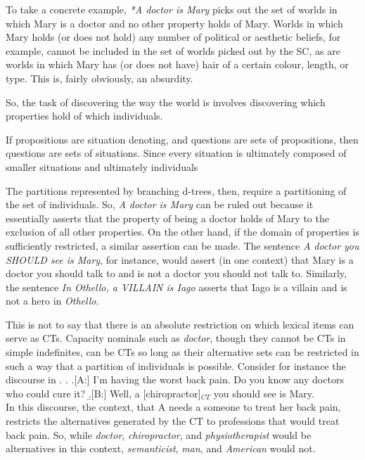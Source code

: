 \documentclass[GPFinal]{subfiles}
\begin{document}
To take a concrete example, \textit{*A doctor is Mary} picks out the set of worlds in which Mary is a doctor and no other property holds of Mary.
Worlds in which Mary holds (or does not hold) any number of political or aesthetic beliefs, for example, cannot be included in the set of worlds picked out by the SC, as are worlds in which Mary has (or does not have) hair of a certain colour, length, or type.
This is, fairly obviously, an absurdity.

So, the task of discovering the way the world is involves discovering which properties hold of which individuals.

If propositions are situation denoting, and questions are sets of propositions, then questions are sets of situations.
Since every situation is ultimately composed of smaller situations and ultimately individuals

The partitions represented by branching d-trees, then, require a partitioning of the set of individuals.
So, \textit{A doctor is Mary} can be ruled out because it essentially asserts that the property of being a doctor holds of Mary to the exclusion of all other properties.
On the other hand, if the domain of properties is sufficiently restricted, a similar assertion can be made.
The sentence \textit{A doctor you SHOULD see is Mary}, for instance, would assert (in one context) that Mary is a doctor you should talk to and is not a doctor you should not talk to.
Similarly, the sentence \textit{In Othello, a VILLAIN is Iago} asserts that Iago is a villain and is not a hero in \textit{Othello}.

This is not to say that there is an absolute restriction on which lexical items can serve as CTs.
Capacity nominals such as \textit{doctor}, though they cannot be CTs in simple indefinites, can be CTs so long as their alternative sets can be restricted in such a way that a partition of individuals is possible.
Consider for instance the discourse in \Next.
\ex.
\a.[A:] I'm having the worst back pain. Do you know any doctors who could cure it?
\b.[B:] Well, a [chiropractor]$_{CT}$ you should see is Mary.\\

In this discourse, the context, that A needs a someone to treat her back pain, restricts the alternatives generated by the CT to professions that would treat back pain.
So, while \textit{doctor}, \textit{chiropractor}, and \textit{physiotherapist} would be alternatives in this context, \textit{semanticist}, \textit{man}, and \textit{American} would not.
\end{document}
